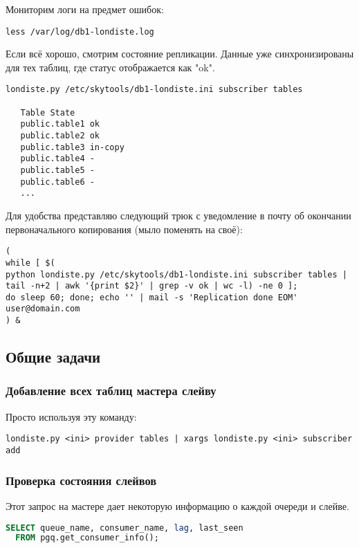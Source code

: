 Мониторим логи на предмет ошибок:
\begin{lstlisting}[label=lst:londiste17,caption=Проверка]
less /var/log/db1-londiste.log
\end{lstlisting}

Если всё хорошо, смотрим состояние репликации. Данные уже синхронизированы для
тех таблиц, где статус отображается как "ok".
\begin{lstlisting}[label=lst:londiste18,caption=Проверка]
londiste.py /etc/skytools/db1-londiste.ini subscriber tables

   Table State
   public.table1 ok
   public.table2 ok
   public.table3 in-copy
   public.table4 -
   public.table5 -
   public.table6 -
   ...
\end{lstlisting}

Для удобства представляю следующий трюк с уведомление в почту об окончании
первоначального копирования (мыло поменять на своё):
\begin{lstlisting}[label=lst:londiste19,caption=Проверка]
(
while [ $(
python londiste.py /etc/skytools/db1-londiste.ini subscriber tables |
tail -n+2 | awk '{print $2}' | grep -v ok | wc -l) -ne 0 ];
do sleep 60; done; echo '' | mail -s 'Replication done EOM' user@domain.com
) &
\end{lstlisting}


\subsection{Общие задачи}

\subsubsection{Добавление всех таблиц мастера слейву}
Просто используя эту команду:
\begin{lstlisting}[label=lst:londiste20,caption=Добавление всех таблиц мастера слейву]
londiste.py <ini> provider tables | xargs londiste.py <ini> subscriber add
\end{lstlisting}

\subsubsection{Проверка состояния слейвов}
Этот запрос на мастере дает некоторую информацию о каждой очереди и слейве.
\begin{lstlisting}[language=SQL,label=lst:londiste21,caption=Проверка состояния слейвов]
SELECT queue_name, consumer_name, lag, last_seen
  FROM pgq.get_consumer_info();
\end{lstlisting}

